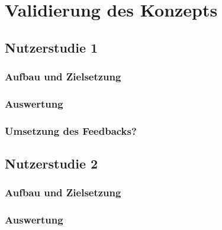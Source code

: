 \chapter{Validierung des Konzepts}\label{cha:ValidierungDesKonzepts}

\lipsum[5]

\section{Nutzerstudie 1}\label{sec:Nutzerstudie1}

\lipsum[5]

\subsection{Aufbau und Zielsetzung}\label{sec:AufbauNutzerstudie1}

\lipsum[5]

\subsection{Auswertung}\label{sec:AuswertungNutzerStudie1}

\lipsum[5]

\subsection{Umsetzung des Feedbacks?}\label{sec:UmsetzungFeedbackNutzerstudie1}

\lipsum[5]

\section{Nutzerstudie 2}\label{sec:Nutzerstudie2}

\lipsum[5]

\subsection{Aufbau und Zielsetzung}\label{sec:AufbauNutzerstudie2}

\lipsum[5]

\subsection{Auswertung}\label{sec:AuswertungNutzerStudie2}

